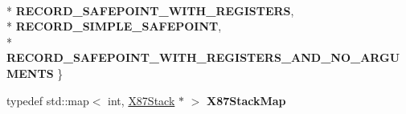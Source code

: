 \begin{DoxyCompactItemize}
\\*
{\bfseries R\+E\+C\+O\+R\+D\+\_\+\+S\+A\+F\+E\+P\+O\+I\+N\+T\+\_\+\+W\+I\+T\+H\+\_\+\+R\+E\+G\+I\+S\+T\+E\+RS}, 
\\*
{\bfseries R\+E\+C\+O\+R\+D\+\_\+\+S\+I\+M\+P\+L\+E\+\_\+\+S\+A\+F\+E\+P\+O\+I\+NT}, 
\\*
{\bfseries R\+E\+C\+O\+R\+D\+\_\+\+S\+A\+F\+E\+P\+O\+I\+N\+T\+\_\+\+W\+I\+T\+H\+\_\+\+R\+E\+G\+I\+S\+T\+E\+R\+S\+\_\+\+A\+N\+D\+\_\+\+N\+O\+\_\+\+A\+R\+G\+U\+M\+E\+N\+TS}
 \}\hypertarget{classv8_1_1internal_1_1_l_code_gen_a166a08e2444941f7aec4c9748db666d0}{}\label{classv8_1_1internal_1_1_l_code_gen_a166a08e2444941f7aec4c9748db666d0}

\item 
typedef std\+::map$<$ int, \hyperlink{classv8_1_1internal_1_1_l_code_gen_1_1_x87_stack}{X87\+Stack} $\ast$ $>$ {\bfseries X87\+Stack\+Map}\hypertarget{classv8_1_1internal_1_1_l_code_gen_acc2f561e783cb0becaa3a44a7edf6038}{}\label{classv8_1_1internal_1_1_l_code_gen_acc2f561e783cb0becaa3a44a7edf6038}

\end{DoxyCompactItemize}
